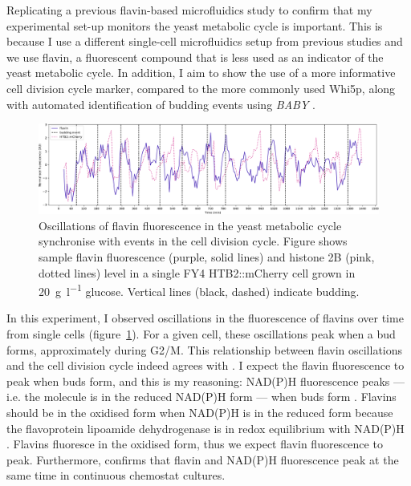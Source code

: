 Replicating a previous flavin-based microfluidics study to confirm that my experimental set-up monitors the yeast metabolic cycle is important.
This is because I use a different single-cell microfluidics setup from previous studies and we use flavin, a fluorescent compound that is less used as an indicator of the yeast metabolic cycle.
In addition, I aim to show the use of a more informative cell division cycle marker, compared to the more commonly used Whi5p, along with automated identification of budding events using \textit{BABY} \parencite{pietschDeterminingGrowthRates2023}.


\begin{figure}
  \centering
    \includegraphics[width=1.0\linewidth]{single_birth_plot_edit.pdf}
    \caption{
      Oscillations of flavin fluorescence in the yeast metabolic cycle synchronise with events in the cell division cycle.
      Figure shows sample flavin fluorescence (purple, solid lines) and histone 2B (pink, dotted lines) level in a single FY4 HTB2::mCherry cell grown in \SI{20}{\gram~\litre^{-1}} glucose.
      Vertical lines (black, dashed) indicate budding.
    }
  \label{fig:biology-highglc-single}
\end{figure}

In this experiment, I observed oscillations in the fluorescence of flavins over time from single cells (figure~\ref{fig:biology-highglc-single}).
For a given cell, these oscillations peak when a bud forms, approximately during G2/M.
This relationship between flavin oscillations and the cell division cycle indeed agrees with \textcite{baumgartnerFlavinbasedMetabolicCycles2018}.
I expect the flavin fluorescence to peak when buds form, and this is my reasoning:
NAD(P)H fluorescence peaks --- i.e. the molecule is in the reduced NAD(P)H form --- when buds form \parencite{papagiannakisAutonomousMetabolicOscillations2017}.
Flavins should be in the oxidised form when NAD(P)H is in the reduced form because the flavoprotein lipoamide dehydrogenase is in redox equilibrium with NAD(P)H \parencite{sianoNADHFlavinFluorescence1989}.
Flavins fluoresce in the oxidised form, thus we expect flavin fluorescence to peak.
Furthermore, \textcite{murrayRedoxRegulationRespiring2011} confirms that flavin and NAD(P)H fluorescence peak at the same time in continuous chemostat cultures.

